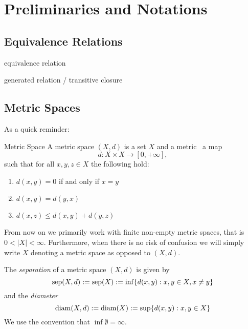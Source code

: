 \chapter{Preliminaries and Notations}

\section{Equivalence Relations}

\begin{definition}{equivalence relation}{}
    \todo
\end{definition}

\begin{definition}{generated relation / transitive closure}{}
    \todo
\end{definition}

\section{Metric Spaces}
As a quick reminder:
\begin{definition}{Metric Space}{}
A metric space $(X,d)$ is a set $X$ and a metric \Ie\ a map
\begin{equation*}
d: X \times X \to [0, +\infty],
\end{equation*}
such that for all $x,y,z \in X$ the following hold:
\begin{enumerate}
    \item $d(x,y) = 0$ if and only if $x = y$
    \item $d(x,y) = d(y,x)$
    \item $d(x,z) \leq d(x,y) + d(y,z)$
\end{enumerate}
\end{definition}
From now on we primarily work with finite non-empty metric spaces, that is $0 < |X| < \infty$.
Furthermore, when there is no risk of confusion we will simply write $X$ denoting a metric space as opposed to $(X,d)$.

\begin{definition}{}{}
The \emph{separation} of a metric space $(X,d)$ is given by
\begin{equation*}
\mathrm{sep}(X,d) := \mathrm{sep}(X) := \inf\{d(x,y): x,y \in X, x \neq y\}
\end{equation*}
and the \emph{diameter}
\begin{equation*}
\mathrm{diam}(X,d) := \mathrm{diam}(X) := \sup\{d(x,y): x,y \in X\}
\end{equation*}
We use the convention that $\inf \emptyset = \infty$. 
\end{definition}

